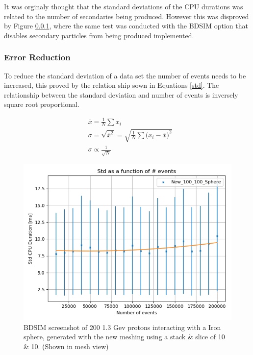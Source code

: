 \documentclass[12pt,a4paper]{article}
\begin{document}
\noindent It was orginaly thought that the standard deviations of the CPU durations was related to the number of secondaries being produced. However this was disproved by Figure \ref{}, where the same test was conducted with the BDSIM option that disables secondary particles from being produced implemented.

\subsubsection{Error Reduction}
To reduce the standard deviation of a data set the number of events needs to be increased, this proved by the relation ship sown in Equations \ref{std}. The relationship between the standard deviation and number of events is inversely square root proportional.

\begin{equation}
\begin{aligned}
& \bar{x} = \frac{1}{N}\sum{x_i}\\
& \sigma = \sqrt{\bar{x}^2} = \sqrt{\frac{1}{N}\sum{(x_i - \bar{x}})^2}\\
& \sigma \propto \frac{1}{\sqrt{N}} 
\end{aligned}
\label{std}
\end{equation}

\begin{figure}[h!]
\centering
\includegraphics[scale=0.5]{Images//Error//std_N.png}
\caption[width=\columnwidth]{BDSIM screenshot of 200 1.3 Gev protons interacting with a Iron sphere, generated with the new meshing using a stack \& slice of 10 \& 10. (Shown in mesh view)}
\label{sphbd}
\end{figure}
\end{document}
